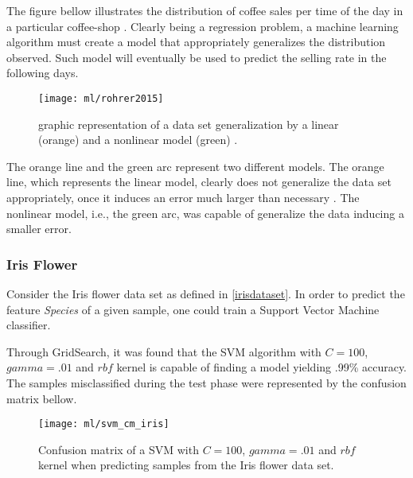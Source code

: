 The figure bellow illustrates the distribution of coffee sales per time of the day in a particular coffee-shop \cite{roh2015}. Clearly being a regression problem, a machine learning algorithm must create a model that appropriately generalizes the distribution observed. Such model will eventually be used to predict the selling rate in the following days.

\begin{figure}[H]
	\centering
	\captionsetup{justification=centering}

	\texttt{[image: ml/rohrer2015]}
	\caption{graphic representation of a data set generalization by a linear (orange) and a nonlinear model (green) \cite{roh2015}.}
	\label{fig:rohrer2015}
\end{figure}

The orange line and the green arc represent two different models. The orange line, which represents the linear model, clearly does not generalize the data set appropriately, once it induces an error much larger than necessary \cite{roh2015}. The nonlinear model, i.e., the green arc, was capable of generalize the data inducing a smaller error.

\subsubsection{Iris Flower}

Consider the Iris flower data set as defined in \ref{irisdataset}. In order to predict the feature {\em Species} of a given sample, one could train a Support Vector Machine classifier.

Through GridSearch, it was found that the SVM algorithm with $C=100$, $gamma=.01$ and $rbf$ kernel is capable of finding a model yielding .99\% accuracy. The samples misclassified during the test phase were represented by the confusion matrix bellow.

\begin{figure}[H]
	\centering
	\captionsetup{justification=centering}

	\texttt{[image: ml/svm\_cm\_iris]}
	\caption{Confusion matrix of a SVM with $C=100$, $gamma=.01$ and $rbf$ kernel when predicting samples from the Iris flower data set.}
	\label{fig:cmsvmiris}
\end{figure}
